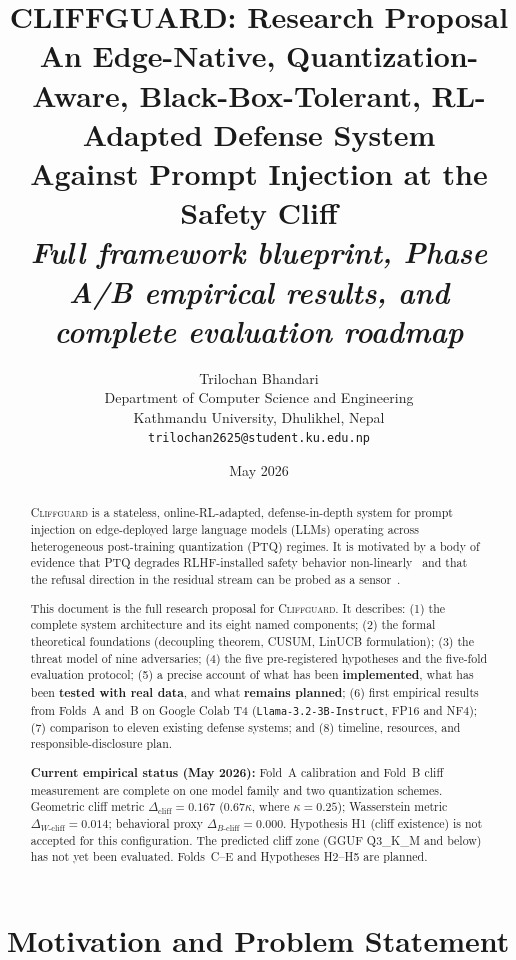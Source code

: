 \documentclass[11pt,a4paper]{article}
\title{%
  \textbf{CLIFFGUARD: Research Proposal}\\[0.3em]
  {\large An Edge-Native, Quantization-Aware, Black-Box-Tolerant,
  RL-Adapted Defense System\\Against Prompt Injection at the Safety Cliff}\\[0.5em]
  {\normalsize \textit{Full framework blueprint, Phase A/B empirical results,
  and complete evaluation roadmap}}
}
\author{
  Trilochan Bhandari\\
  \small Department of Computer Science and Engineering\\
  \small Kathmandu University, Dhulikhel, Nepal\\
  \small \texttt{trilochan2625@student.ku.edu.np}
}
\date{May 2026}
\newcommand{\cliff}{\Delta_{\mathrm{cliff}}}
\newcommand{\wcliff}{\Delta_{W\text{-cliff}}}
\newcommand{\bcliff}{\Delta_{B\text{-cliff}}}
\newcommand{\kap}{\kappa}
\newcommand{\CG}{\textsc{Cliffguard}}
\begin{document}
\maketitle
\thispagestyle{plain}

\begin{abstract}
\CG{} is a stateless, online-RL-adapted, defense-in-depth system for prompt
injection on edge-deployed large language models (LLMs) operating across
heterogeneous post-training quantization (PTQ) regimes.
It is motivated by a body of evidence that PTQ degrades RLHF-installed safety
behavior non-linearly~\citep{egashira2024exploiting,mindthegap2025,hong2024quant}
and that the refusal direction in the residual stream can be probed as a
sensor~\citep{arditi2024refusal,zhao2025refusal}.

This document is the full research proposal for \CG{}.
It describes: (1) the complete system architecture and its eight named components;
(2) the formal theoretical foundations (decoupling theorem, CUSUM, LinUCB
formulation); (3) the threat model of nine adversaries; (4) the five
pre-registered hypotheses and the five-fold evaluation protocol; (5)
a precise account of what has been \textbf{implemented}, what has been
\textbf{tested with real data}, and what \textbf{remains planned};
(6) first empirical results from Folds~A and~B on Google Colab T4
(\texttt{Llama-3.2-3B-Instruct}, FP16 and NF4); (7) comparison to eleven
existing defense systems; and (8) timeline, resources, and
responsible-disclosure plan.

\textbf{Current empirical status (May 2026):}
Fold~A calibration and Fold~B cliff measurement are complete on one model family
and two quantization schemes.
Geometric cliff metric $\cliff = 0.167$ ($0.67\kap$, where $\kap=0.25$);
Wasserstein metric $\wcliff = 0.014$; behavioral proxy $\bcliff = 0.000$.
Hypothesis H1 (cliff existence) is not accepted for this configuration.
The predicted cliff zone (GGUF Q3\_K\_M and below) has not yet been evaluated.
Folds~C--E and Hypotheses H2--H5 are planned.
\end{abstract}

\tableofcontents
\newpage

\section{Motivation and Problem Statement}
\label{sec:motivation}
\end{document}
